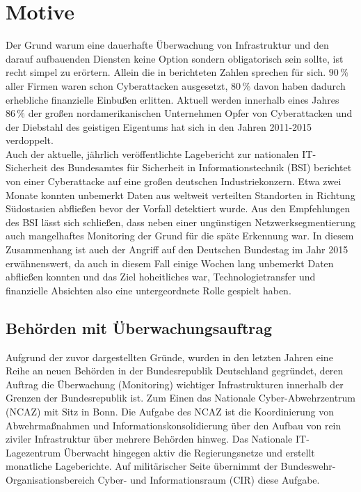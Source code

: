 \section{Motive}

Der Grund warum eine dauerhafte Überwachung von Infrastruktur und den darauf aufbauenden 
Diensten keine Option sondern obligatorisch sein sollte, ist recht simpel zu erörtern. 
Allein die in \cite[461]{francia} berichteten Zahlen sprechen für sich. $90\,\%$ aller 
Firmen waren schon Cyberattacken ausgesetzt, $80\,\%$ davon haben dadurch erhebliche 
finanzielle Einbußen erlitten. Aktuell werden innerhalb eines Jahres $86\,\%$ der großen 
nordamerikanischen Unternehmen Opfer von Cyberattacken und der Diebstahl des geistigen 
Eigentums hat sich in den Jahren 2011-2015 verdoppelt.\\
Auch der aktuelle, jährlich veröffentlichte Lagebericht zur nationalen IT-Sicherheit des
Bundesamtes für Sicherheit in Informationstechnik (BSI) \cite[12]{bsi-lagebericht} 
berichtet  
von einer Cyberattacke auf eine großen deutschen Industriekonzern. Etwa zwei Monate 
konnten unbemerkt Daten aus weltweit verteilten Standorten in Richtung Südostasien 
abfließen bevor der Vorfall detektiert wurde. Aus den Empfehlungen des BSI lässt sich 
schließen, dass neben einer ungünstigen Netzwerksegmentierung auch mangelhaftes Monitoring
der Grund für die späte Erkennung war. In diesem Zusammenhang ist auch der Angriff auf 
den Deutschen Bundestag im Jahr 2015 erwähnenswert, da auch in diesem Fall einige Wochen 
lang unbemerkt Daten abfließen konnten und das Ziel hoheitliches war, 
Technologietransfer und finanzielle Absichten also eine untergeordnete Rolle gespielt 
haben.
\subsection{Behörden mit Überwachungsauftrag}

Aufgrund der zuvor dargestellten Gründe, wurden in den letzten Jahren eine Reihe an neuen 
Behörden in der Bundesrepublik Deutschland gegründet, deren Auftrag die Überwachung 
(Monitoring) wichtiger Infrastrukturen innerhalb der Grenzen der Bundesrepublik ist. Zum 
Einen das Nationale Cyber-Abwehrzentrum (NCAZ) \cite{web_ncaz} mit Sitz in Bonn. Die 
Aufgabe 
des NCAZ ist 
die Koordinierung von Abwehrmaßnahmen und Informationskonsolidierung über den Aufbau von 
rein ziviler Infrastruktur über mehrere Behörden hinweg. Das Nationale IT-Lagezentrum 
\cite{web_lagezentrum} 
Überwacht hingegen aktiv die Regierungsnetze und erstellt monatliche Lageberichte. Auf 
militärischer Seite übernimmt der Bundeswehr-Organisationsbereich Cyber- und 
Informationsraum (CIR) diese Aufgabe.

